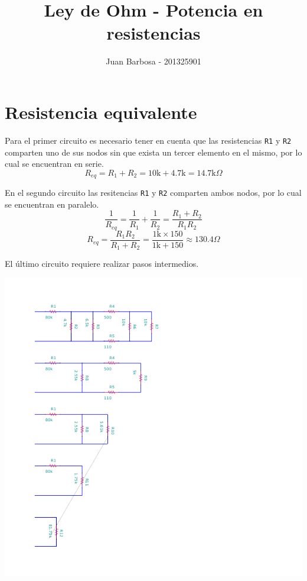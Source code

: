 \documentclass[12pt]{article}
\title{Ley de Ohm - Potencia en resistencias}
\author{Juan Barbosa - 201325901}
\begin{document}
\maketitle

\section{Resistencia equivalente}
Para el primer circuito es necesario tener en cuenta que las resistencias \verb|R1| y \verb|R2| comparten uno de sus nodos sin que exista un tercer elemento en el mismo, por lo cual se encuentran en serie.
\begin{equation}
	R_{eq}=R_1+R_2=10\text{k}+4.7\text{k}=14.7\text{k}\Omega
\end{equation}

En el segundo circuito las resitencias \verb|R1| y \verb|R2| comparten ambos nodos, por lo cual se encuentran en paralelo.
\begin{equation*}
	\dfrac{1}{R_{eq}}=\dfrac{1}{R_{1}}+\dfrac{1}{R_{2}}=\dfrac{R_1+R_2}{R_1R_2}
\end{equation*}
\begin{equation}\label{eq: paralelo}
	R_{eq}=\dfrac{R_1R_2}{R_1+R_2}=\dfrac{1\text{k}\times150}{1\text{k}+150}\approx 130.4 \Omega
\end{equation}

El \'ultimo circuito requiere realizar pasos intermedios.
\begin{center}
	\includegraphics[scale=2]{Circuito1.pdf}
\end{center}
\end{document}
